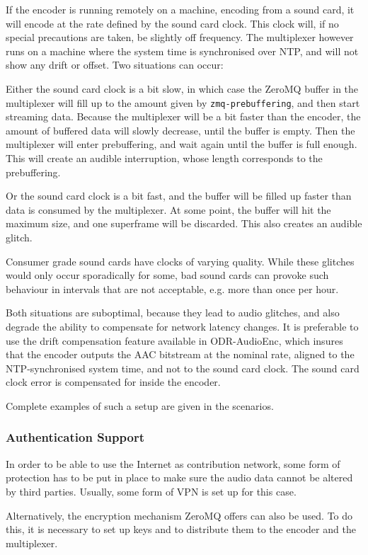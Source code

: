 If the encoder is running remotely on a machine, encoding from a sound card, it
will encode at the rate defined by the sound card clock. This clock will, if no
special precautions are taken, be slightly off frequency. The multiplexer
however runs on a machine where the system time is synchronised over NTP, and
will not show any drift or offset. Two situations can occur:

Either the sound card clock is a bit slow, in which case the ZeroMQ buffer in
the multiplexer will fill up to the amount given by \texttt{zmq-prebuffering},
and then start streaming data. Because the multiplexer will be a bit faster
than the encoder, the amount of buffered data will slowly decrease, until the
buffer is empty. Then the multiplexer will enter prebuffering, and wait again
until the buffer is full enough. This will create an audible interruption,
whose length corresponds to the prebuffering.

Or the sound card clock is a bit fast, and the buffer will be filled up faster
than data is consumed by the multiplexer. At some point, the buffer will hit
the maximum size, and one superframe will be discarded. This also creates an
audible glitch.

Consumer grade sound cards have clocks of varying quality. While these glitches
would only occur sporadically for some, bad sound cards can provoke such
behaviour in intervals that are not acceptable, e.g. more than once per hour.

Both situations are suboptimal, because they lead to audio glitches, and also
degrade the ability to compensate for network latency changes. It is preferable
to use the drift compensation feature available in ODR-AudioEnc, which
insures that the encoder outputs the AAC bitstream at the nominal rate, aligned
to the NTP-synchronised system time, and not to the sound card clock. The sound
card clock error is compensated for inside the encoder.

Complete examples of such a setup are given in the scenarios.

\subsubsection{Authentication Support}
In order to be able to use the Internet as contribution network, some form of
protection has to be put in place to make sure the audio data cannot be altered
by third parties. Usually, some form of VPN is set up for this case.

Alternatively, the encryption mechanism ZeroMQ offers can also be used. To do
this, it is necessary to set up keys and to distribute them to the encoder and
the multiplexer.

